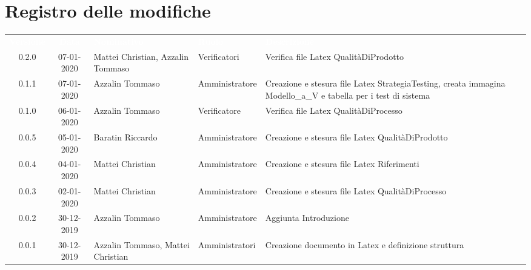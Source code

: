 \section*{Registro delle modifiche}
{
\renewcommand{\arraystretch}{1.5}
\centering
\begin{longtable}{ c c  C{4cm}  C{3cm} C{4cm}}
\textcolor{white}{\textbf{Versione}} & \textcolor{white}{\textbf{Data}} & \textcolor{white}{\textbf{Nominativo}} & \textcolor{white}{\textbf{Ruolo}} & \textcolor{white}{\textbf{Descrizione}}\\	

0.2.0 & 07-01-2020 & Mattei Christian, Azzalin Tommaso & Verificatori & Verifica file Latex QualitàDiProdotto \\
0.1.1 & 07-01-2020 & Azzalin Tommaso & Amministratore & Creazione e stesura file Latex StrategiaTesting, creata immagina Modello\_a\_V e tabella per i test di sistema \\
0.1.0 & 06-01-2020 & Azzalin Tommaso & Verificatore & Verifica file Latex QualitàDiProcesso \\
0.0.5 & 05-01-2020 & Baratin Riccardo & Amministratore & Creazione e stesura file Latex QualitàDiProdotto \\
0.0.4 & 04-01-2020 & Mattei Christian & Amministratore & Creazione e stesura file Latex Riferimenti \\
0.0.3 & 02-01-2020 & Mattei Christian & Amministratore & Creazione e stesura file Latex QualitàDiProcesso \\
0.0.2 & 30-12-2019 & Azzalin Tommaso & Amministratore & Aggiunta Introduzione \\
0.0.1 & 30-12-2019 & Azzalin Tommaso, Mattei Christian & Amministratori & Creazione documento in Latex e definizione struttura \\	
		
\end{longtable}
}
